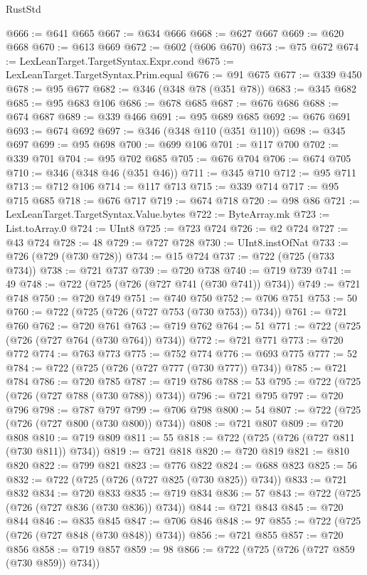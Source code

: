 \begin{lexlean}{RustStd}
\begin{coremodule}
{\begin{coremodule}
{{{{{{{{{{{{{{{{{{{{{{{{{{{{{{{{{{{{{{{@666 := @641 @665
@667 := @634 @666
@668 := @627 @667
@669 := @620 @668
@670 := @613 @669
@672 := @602 (@606 @670)
@673 := @75 @672
@674 := LexLeanTarget.TargetSyntax.Expr.cond
@675 := LexLeanTarget.TargetSyntax.Prim.equal
@676 := @91 @675
@677 := @339 @450
@678 := @95 @677
@682 := @346 (@348 @78 (@351 @78))
@683 := @345 @682
@685 := @95 @683 @106
@686 := @678 @685
@687 := @676 @686
@688 := @674 @687
@689 := @339 @466
@691 := @95 @689 @685
@692 := @676 @691
@693 := @674 @692
@697 := @346 (@348 @110 (@351 @110))
@698 := @345 @697
@699 := @95 @698
@700 := @699 @106
@701 := @117 @700
@702 := @339 @701
@704 := @95 @702 @685
@705 := @676 @704
@706 := @674 @705
@710 := @346 (@348 @46 (@351 @46))
@711 := @345 @710
@712 := @95 @711
@713 := @712 @106
@714 := @117 @713
@715 := @339 @714
@717 := @95 @715 @685
@718 := @676 @717
@719 := @674 @718
@720 := @98 @86
@721 := LexLeanTarget.TargetSyntax.Value.bytes
@722 := ByteArray.mk
@723 := List.toArray.{0}
@724 := UInt8
@725 := @723 @724
@726 := @2 @724
@727 := @43 @724
@728 := 48
@729 := @727 @728
@730 := UInt8.instOfNat
@733 := @726 (@729 (@730 @728))
@734 := @15 @724
@737 := @722 (@725 (@733 @734))
@738 := @721 @737
@739 := @720 @738
@740 := @719 @739
@741 := 49
@748 := @722 (@725 (@726 (@727 @741 (@730 @741)) @734))
@749 := @721 @748
@750 := @720 @749
@751 := @740 @750
@752 := @706 @751
@753 := 50
@760 := @722 (@725 (@726 (@727 @753 (@730 @753)) @734))
@761 := @721 @760
@762 := @720 @761
@763 := @719 @762
@764 := 51
@771 := @722 (@725 (@726 (@727 @764 (@730 @764)) @734))
@772 := @721 @771
@773 := @720 @772
@774 := @763 @773
@775 := @752 @774
@776 := @693 @775
@777 := 52
@784 := @722 (@725 (@726 (@727 @777 (@730 @777)) @734))
@785 := @721 @784
@786 := @720 @785
@787 := @719 @786
@788 := 53
@795 := @722 (@725 (@726 (@727 @788 (@730 @788)) @734))
@796 := @721 @795
@797 := @720 @796
@798 := @787 @797
@799 := @706 @798
@800 := 54
@807 := @722 (@725 (@726 (@727 @800 (@730 @800)) @734))
@808 := @721 @807
@809 := @720 @808
@810 := @719 @809
@811 := 55
@818 := @722 (@725 (@726 (@727 @811 (@730 @811)) @734))
@819 := @721 @818
@820 := @720 @819
@821 := @810 @820
@822 := @799 @821
@823 := @776 @822
@824 := @688 @823
@825 := 56
@832 := @722 (@725 (@726 (@727 @825 (@730 @825)) @734))
@833 := @721 @832
@834 := @720 @833
@835 := @719 @834
@836 := 57
@843 := @722 (@725 (@726 (@727 @836 (@730 @836)) @734))
@844 := @721 @843
@845 := @720 @844
@846 := @835 @845
@847 := @706 @846
@848 := 97
@855 := @722 (@725 (@726 (@727 @848 (@730 @848)) @734))
@856 := @721 @855
@857 := @720 @856
@858 := @719 @857
@859 := 98
@866 := @722 (@725 (@726 (@727 @859 (@730 @859)) @734))
}}}}}}}}}}}}}}}}}}}}}}}}}}}}}}}}}}}}}}}
\end{coremodule}}
\end{coremodule}
\end{lexlean}
